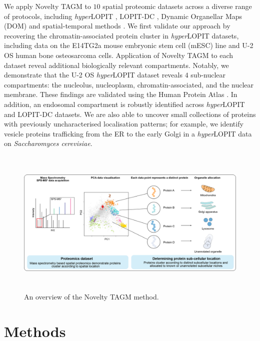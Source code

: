 \documentclass[12pt,english]{article}
\begin{document}
We apply Novelty TAGM to $10$ spatial proteomic datasets across a diverse range of protocols, including \textit{hyper}LOPIT \citep{hyper, Mulvey:2017}, LOPIT-DC \citep{DC:2018}, Dynamic Organellar Maps (DOM) \citep{Itzhak:2016} and spatial-temporal methods \citep{Jean_Beltran:2016}. We first validate our approach by recovering the chromatin-associated protein cluster in \textit{hyper}LOPIT datasets, including data on the E14TG2a mouse embryonic stem cell (mESC) line and U-2 OS human bone osteosarcoma cells. Application of Novelty TAGM to each dataset reveal additional biologically relevant compartments. Notably, we demonstrate that the U-2 OS \textit{hyper}LOPIT dataset reveals $4$ sub-nuclear compartments: the nucleolus,  nucleoplasm, chromatin-associated, and the nuclear membrane. These findings are validated using the Human Protein Atlas \citep{Thul:2017,Sullivan:2018}. In addition, an endosomal compartment is robustly identified across \textit{hyper}LOPIT and LOPIT-DC datasets. We are also able to uncover small collections of proteins with previously uncharacterised localisation patterns; for example, we identify vesicle proteins trafficking from the ER to the early Golgi in a \textit{hyper}LOPIT data on \textit{Saccharomyces cerevisiae}.
\begin{figure}[h]
	
	\centering
	\includegraphics[height=2.8in]{IMG_Protein_Allocation_Draft_v2}
	\caption{An overview of the Novelty TAGM method.}
	\label{figure:overview}
\end{figure}

\section{Methods}
\end{document}
